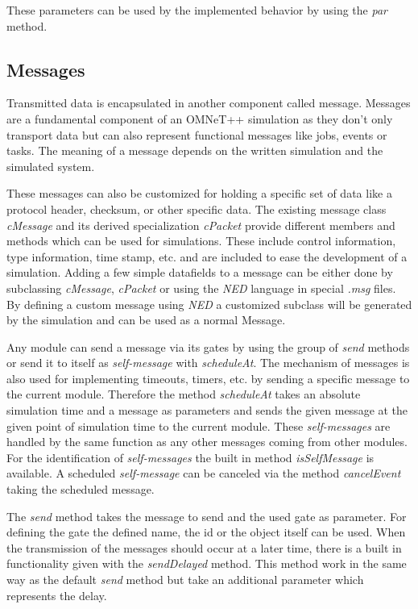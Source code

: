 These parameters can be used by the implemented behavior by using the \emph{par} method. \cite[section 3.6]{omnet_manual}

\subsection{Messages}
\label{sec:omnet_components_messages}
Transmitted data is encapsulated in another component called message.
Messages are a fundamental component of an OMNeT++ simulation as they don't only transport data but can also represent functional messages like jobs, events or tasks.
The meaning of a message depends on the written simulation and the simulated system. \cite[chapter 5]{omnet_manual}

These messages can also be customized for holding a specific set of data like a protocol header, checksum, or other specific data.
The existing message class \emph{cMessage} and its derived specialization \emph{cPacket} provide different members and methods which can be used for simulations.
These include control information, type information, time stamp, etc. and are included to ease the development of a simulation.
Adding a few simple datafields to a message can be either done by subclassing \emph{cMessage}, \emph{cPacket} or using the \emph{NED} language in special \emph{.msg} files.
By defining a custom message using \emph{NED} a customized subclass will be generated by the simulation and can be used as a normal Message. \cite[chapter 6]{omnet_manual}

Any module can send a message via its gates by using the group of \emph{send} methods or send it to itself as \emph{self-message} with \emph{scheduleAt}.
The mechanism of messages is also used for implementing timeouts, timers, etc. by sending a specific message to the current module.
Therefore the method \emph{scheduleAt} takes an absolute simulation time and a message as parameters and sends the given message at the given point of simulation time to the current module.
These \emph{self-messages} are handled by the same function as any other messages coming from other modules.
For the identification of \emph{self-messages} the built in method \emph{isSelfMessage} is available.
A scheduled \emph{self-message} can be canceled via the method \emph{cancelEvent} taking the scheduled message. \cite[section 4.7.1]{omnet_manual}

The \emph{send} method takes the message to send and the used gate as parameter.
For defining the gate the defined name, the id or the object itself can be used. \cite[section 4.7.2]{omnet_manual}
When the transmission of the messages should occur at a later time, there is a built in functionality given with the \mbox{\emph{sendDelayed}} method.
This method work in the same way as the default \emph{send} method but take an additional parameter which represents the delay. \cite[section 4.7.6]{omnet_manual}

